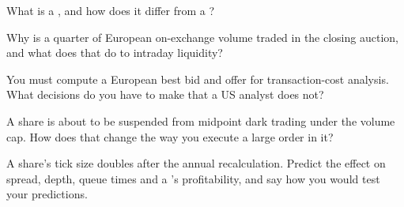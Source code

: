 \begin{interviewq}\label{iq:m1:european-equity-market-structure:2}
What is a , and how does it differ from a ?
\end{interviewq}

\begin{interviewq}\label{iq:m1:european-equity-market-structure:3}
Why is a quarter of European on-exchange volume traded in the closing
auction, and what does that do to intraday liquidity?
\end{interviewq}

\begin{interviewq}\label{iq:m1:european-equity-market-structure:4}
You must compute a European best bid and offer for transaction-cost analysis.
What decisions do you have to make that a US analyst does not?
\end{interviewq}

\begin{interviewq}\label{iq:m1:european-equity-market-structure:5}
A share is about to be suspended from midpoint dark trading under the volume
cap. How does that change the way you execute a large order in it?
\end{interviewq}

\begin{interviewq}\label{iq:m1:european-equity-market-structure:6}
A share's tick size doubles after the annual recalculation. Predict the
effect on spread, depth, queue times and a 's profitability, and
say how you would test your predictions.
\end{interviewq}
